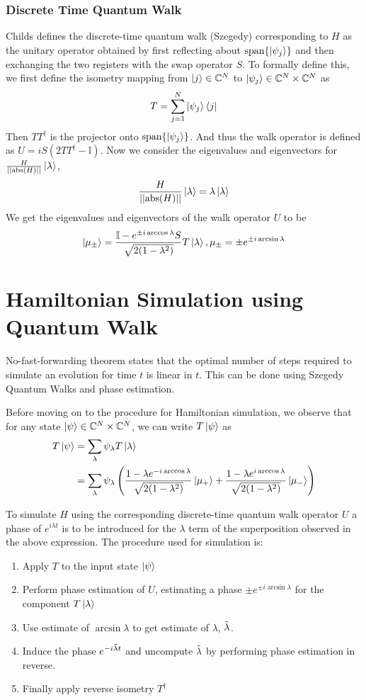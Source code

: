 \documentclass[
10pt, %
a4paper, %
oneside, %
headinclude,footinclude, %
BCOR5mm, %
]{scrartcl}
\begin{document}
\subsubsection{Discrete Time Quantum Walk}
Childs defines the discrete-time quantum walk (Szegedy) corresponding to $H$ as the unitary operator obtained
by first reflecting about $\text{span}\{\ket{\psi_j}\}$ and then exchanging the two registers with the swap operator $S$. To formally define this, we first define the isometry mapping from $\ket j\in\mathbb{C}^N$ to $\ket{\psi_j}\in\mathbb{C}^N\times\mathbb{C}^N$ as
$$T=\sum_{j=1}^N\ket{\psi_j}\bra j$$\label{T_def}
Then $TT^{\dagger}$ is the projector onto $\text{span}\{\ket{\psi_j}\}$. And thus the walk operator is defined as $U=iS(2TT^{\dagger}-\mathbb{I})$\label{szegedy_walk_operator}. Now we consider the eigenvalues and eigenvectors for $\frac{H}{||\text{abs}(H)||}\ket\lambda$,
$$\frac{H}{||\text{abs}(H)||}\ket\lambda=\lambda\ket\lambda$$
We get the eigenvalues and eigenvectors of the walk operator $U$ to be
$$\ket{\mu_{\pm}}=\frac{\mathbb{I}-e^{\pm i\arccos\lambda}S}{\sqrt{2(1-\lambda^2)}}T\ket\lambda,\mu_{\pm}=\pm e^{\pm i\arcsin\lambda}$$\label{eigenvalue_eigenvector_szegedy_walk_operator_def}

\section{Hamiltonian Simulation using Quantum Walk}

No-fast-forwarding theorem states that the optimal number of steps required to simulate an evolution for time $t$ is linear in $t$. This can be done using Szegedy Quantum Walks and phase estimation.

Before moving on to the procedure for Hamiltonian simulation, we observe that for any state $\ket\psi\in\mathbb{C}^N\times\mathbb{C}^N$, we can write $T\ket\psi$ as
\begin{align*}
T\ket\psi&=\sum_\lambda \psi_\lambda T\ket\lambda\\
&=\sum_\lambda \psi_\lambda\left(\frac{1-\lambda e^{-i\arccos\lambda}}{\sqrt{2(1-\lambda^2)}}\ket{\mu_+}+\frac{1-\lambda e^{i\arccos\lambda}}{\sqrt{2(1-\lambda^2)}}\ket{\mu_-}\right)
\end{align*}

To simulate $H$ using the corresponding discrete-time quantum walk operator $U$ a phase of $e^{i\lambda t}$ is to be introduced for the $\lambda$ term of the superposition observed in the above expression. The procedure used for simulation is:
\begin{enumerate}
\item Apply $T$ to the input state $\ket\psi$
\item Perform phase estimation of $U$, estimating a phase $\pm e^{\pm i\arcsin\lambda}$ for the component $T\ket\lambda$
\item Use estimate of $\arcsin\lambda$ to get estimate of $\lambda$, $\Tilde{\lambda}$.
\item Induce the phase $e^{-i\Tilde{\lambda}t}$ and uncompute $\Tilde{\lambda}$ by performing phase estimation in reverse.
\item Finally apply reverse isometry $T^{\dagger}$
\end{enumerate}
\end{document}

